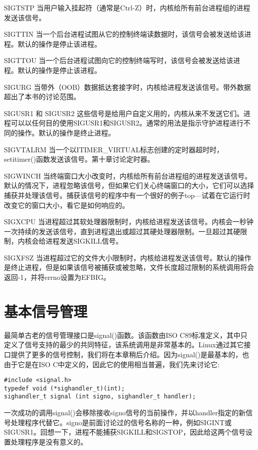 \begin{eqlist*}
\item[SIGTSTP] 当用户输入挂起符（通常是Ctrl-Z）时，内核给所有前台进程组的进程发送该信号。
\item[SIGTTIN] 当一个后台进程试图从它的控制终端读数据时，该信号会被发送给该进程。默认的操作是停止该进程。
\item[SIGTTOU] 当一个后台进程试图向它的控制终端写时，该信号会被发送给该进程。默认的操作是停止该进程。
\item[SIGURG] 当带外（OOB）数据抵达套接字时，内核给进程发送该信号。带外数据超出了本书的讨论范围。
\item[SIGUSR1 和 SIGUSR2]
 这些信号是给用户自定义用的，内核从来不发送它们。进程可以以任何目的使用SIGUSR1和SIGUSR2。通常的用法是指示守护进程进行不同的操作。默认的操作是终止进程。
\item[SIGVTALRM] 当一个以ITIMER\_VIRTUAL标志创建的定时器超时时，setitimer()函数发送该信号。第十章讨论定时器。
\item[SIGWINCH] 当终端窗口大小改变时，内核给所有前台进程组的进程发送该信号。默认的情况下，进程忽略该信号，但如果它们关心终端窗口的大小，它们可以选择捕获并处理该信号。捕获该信号的程序中有一个很好的例子top---试着在它运行时改变它的窗口大小，看它是如何响应的。
\item[SIGXCPU] 当进程超过其软处理器限制时，内核给进程发送该信号。内核会一秒钟一次持续的发送该信号，直到进程退出或超过其硬处理器限制。一旦超过其硬限制，内核会给进程发送SIGKILL信号。
\item[SIGXFSZ] 当进程超过它的文件大小限制时，内核给进程发送该信号。默认的操作是终止进程，但是如果该信号被捕获或被忽略，文件长度超过限制的系统调用将会返回-1，并将errno设置为EFBIG。
\end{eqlist*}

\section{基本信号管理}

最简单古老的信号管理接口是signal()函数。该函数由ISO C89标准定义，其中只定义了信号支持的最少的共同特征，该系统调用是非常基本的。Linux通过其它接口提供了更多的信号控制，我们将在本章稍后介绍。因为signal()是最基本的，也由于它是在ISO C中定义的，因此它的使用相当普遍，我们先来讨论它:

\begin{lstlisting}
#include <signal.h>
typedef void (*sighandler_t)(int);
sighandler_t signal (int signo, sighandler_t handler);
\end{lstlisting}

一次成功的调用signal()会移除接收signo信号的当前操作，并以handler指定的新信号处理程序代替它。signo是前面讨论过的信号名称的一种，例如SIGINT或SIGUSR1。回想一下，进程不能捕获SIGKILL和SIGSTOP，因此给这两个信号设置处理程序是没有意义的。

